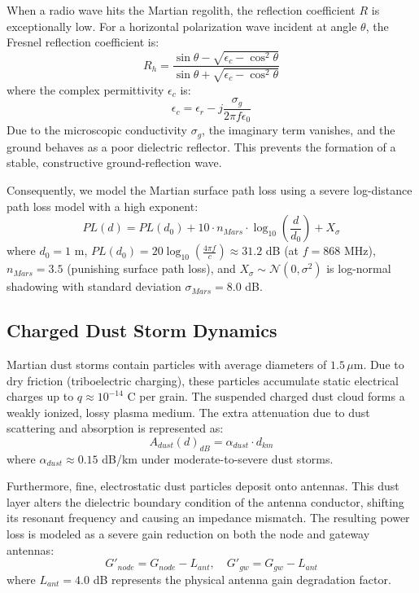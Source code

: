 \documentclass{ijuc}
\begin{document}
When a radio wave hits the Martian regolith, the reflection coefficient $R$ is exceptionally low. For a horizontal polarization wave incident at angle $\theta$, the Fresnel reflection coefficient is:
\begin{equation}
    R_h = \frac{\sin\theta - \sqrt{\epsilon_c - \cos^2\theta}}{\sin\theta + \sqrt{\epsilon_c - \cos^2\theta}}
\end{equation}
where the complex permittivity $\epsilon_c$ is:
\begin{equation}
    \epsilon_c = \epsilon_r - j\frac{\sigma_g}{2\pi f \epsilon_0}
\end{equation}
Due to the microscopic conductivity $\sigma_g$, the imaginary term vanishes, and the ground behaves as a poor dielectric reflector. This prevents the formation of a stable, constructive ground-reflection wave. 

Consequently, we model the Martian surface path loss using a severe log-distance path loss model with a high exponent:
\begin{equation}
    PL(d) = PL(d_0) + 10 \cdot n_{Mars} \cdot \log_{10}\left(\frac{d}{d_0}\right) + X_{\sigma}
\end{equation}
where $d_0 = 1$ m, $PL(d_0) = 20\log_{10}(\frac{4\pi f}{c}) \approx 31.2$ dB (at $f = 868$ MHz), $n_{Mars} = 3.5$ (punishing surface path loss), and $X_\sigma \sim \mathcal{N}(0, \sigma^2)$ is log-normal shadowing with standard deviation $\sigma_{Mars} = 8.0$ dB.

\subsection{Charged Dust Storm Dynamics}
Martian dust storms contain particles with average diameters of $1.5\,\mu\text{m}$. Due to dry friction (triboelectric charging), these particles accumulate static electrical charges up to $q \approx 10^{-14}$ C per grain. The suspended charged dust cloud forms a weakly ionized, lossy plasma medium. The extra attenuation due to dust scattering and absorption is represented as:
\begin{equation}
    A_{dust}(d)_{dB} = \alpha_{dust} \cdot d_{km}
\end{equation}
where $\alpha_{dust} \approx 0.15$ dB/km under moderate-to-severe dust storms.

Furthermore, fine, electrostatic dust particles deposit onto antennas. This dust layer alters the dielectric boundary condition of the antenna conductor, shifting its resonant frequency and causing an impedance mismatch. The resulting power loss is modeled as a severe gain reduction on both the node and gateway antennas:
\begin{equation}
    G'_{node} = G_{node} - L_{ant}, \quad G'_{gw} = G_{gw} - L_{ant}
\end{equation}
where $L_{ant} = 4.0$ dB represents the physical antenna gain degradation factor.
\end{document}
